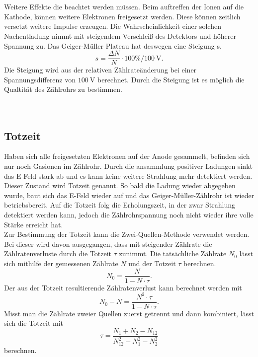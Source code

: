 \\
\\
Weitere Effekte die beachtet werden müssen. Beim auftreffen der Ionen auf die Kathode,
können weitere Elektronen freigesetzt werden. Diese können zeitlich versetzt weitere Impulse erzeugen.
Die Wahrscheinlichkeit einer solchen Nachentladung nimmt mit steigendem Verschleiß des Detektors und höherer Spannung zu.
Das Geiger-Müller Plateau hat deswegen eine Steigung s.
\begin{equation*}
    s = \frac{ΔN}{N} \cdot 100\%/\SI{100}{\volt}.
\end{equation*}
Die Steigung wird aus der relativen Zählrateänderung bei einer Spannungsdifferenz von $\SI{100}{\volt}$ berechnet.
Durch die Steigung ist es möglich die Qualtität des Zählrohrs zu bestimmen.\\
\\
\\
\subsection{Totzeit}
\label{sec:Totzeit}

Haben sich alle freigesetzten Elektronen auf der Anode gesammelt, befinden sich nur noch Gasionen im Zählrohr.
Durch die ansammlung positiver Ladungen sinkt das E-Feld stark ab und es kann keine weitere Strahlung mehr detektiert werden.
Dieser Zustand wird Totzeit genannt. So bald die Ladung wieder abgegeben wurde, baut sich das E-Feld wieder auf und das Geiger-Müller-Zählrohr ist wieder betriebsbereit.
Auf die Totzeit folg die Erholungszeit, in der zwar Strahlung detektiert werden kann, jedoch die Zählrohrspannung noch nicht wieder ihre volle Stärke erreicht hat.
\\
Zur Bestimmung der Totzeit kann die Zwei-Quellen-Methode verwendet werden.
Bei dieser wird davon ausgegangen, dass mit steigender Zählrate die Zählratenverluste durch die Totzeit $τ$ zunimmt.
Die tatsächliche Zählrate $N_0$ lässt sich mithilfe der gemessenen Zählrate $N$ und der Totzeit $τ$ berechnen.
\begin{equation*}
    N_0 = \frac{N}{1-N \cdot τ}.
\end{equation*}
Der aus der Totzeit resultierende Zählratenverlust kann berechnet werden mit
\begin{equation*}
    N_0 - N = \frac{N^2 \cdot τ}{1 - N \cdot τ}.
\end{equation*}
Misst man die Zählrate zweier Quellen zuerst getrennt und dann kombiniert, lässt sich die Totzeit mit
\begin{equation}\label{eq:totzeit}
    τ = \frac{N_1 + N_2 - N_{12}}{N_{12}^2 - N_1^2 - N_2^2}
\end{equation}
berechnen.
\\
\\
